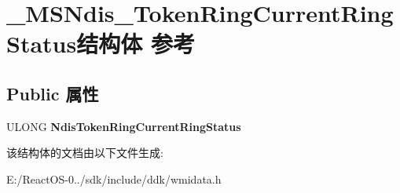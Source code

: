 \hypertarget{struct___m_s_ndis___token_ring_current_ring_status}{}\section{\+\_\+\+M\+S\+Ndis\+\_\+\+Token\+Ring\+Current\+Ring\+Status结构体 参考}
\label{struct___m_s_ndis___token_ring_current_ring_status}
\subsection*{Public 属性}
\begin{DoxyCompactItemize}
\item 
\mbox{\label{struct___m_s_ndis___token_ring_current_ring_status_a49518049b1c6e7ad3a114866a23812ac}} 
U\+L\+O\+NG {\bfseries Ndis\+Token\+Ring\+Current\+Ring\+Status}
\end{DoxyCompactItemize}


该结构体的文档由以下文件生成\+:\begin{DoxyCompactItemize}
\item 
E\+:/\+React\+O\+S-\/0../sdk/include/ddk/wmidata.\+h\end{DoxyCompactItemize}
